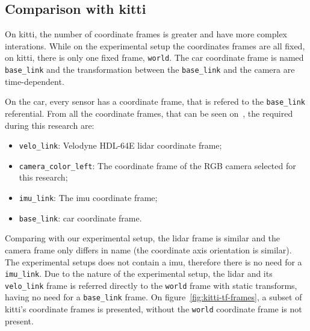 \subsection{Comparison with \ac{kitti}}
\label{subsec:calibration:kitii-comparision}

On \ac{kitti}, the number of coordinate frames is greater and have more complex interations. While on the experimental setup the coordinates frames are all fixed, on \ac{kitti}, there is only one fixed frame, \texttt{world}. The car coordinate frame is named \texttt{base\_link} and the transformation between the \texttt{base\_link} and the camera are time-dependent.

On the car, every sensor has a coordinate frame, that is refered to the \texttt{base\_link} referential. From all the coordinate frames, that can be seen on~\cite{Geiger2013a}, the required during this research are:

\begin{itemize}
	\item \texttt{velo\_link}: Velodyne HDL-64E \ac{lidar} coordinate frame;
	\item \texttt{camera\_color\_left}: The coordinate frame of the RGB camera selected for this research;
	\item \texttt{imu\_link}: The \ac{imu} coordinate frame;
	\item \texttt{base\_link}: car coordinate frame.
\end{itemize}

Comparing with our experimental setup, the \ac{lidar} frame is similar and the camera frame only differs in name (the coordinate axis orientation is similar). The experimental setups does not contain a \ac{imu}, therefore there is no need for a \texttt{imu\_link}. Due to the nature of the experimental setup, the \ac{lidar} and its \texttt{velo\_link} frame is referred directly to the \texttt{world} frame with static transforms, having no need for a \texttt{base\_link} frame. On figure~\ref{fig:kitti-tf-frames}, a subset of \ac{kitti}'s coordinate frames is presented, without the \texttt{world} coordinate frame is not present. 

